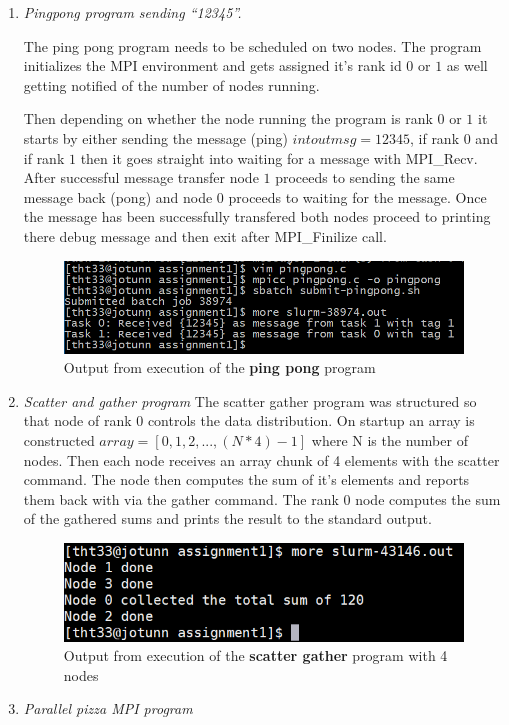 \documentclass[fontsize=14pt,a4paper]{scrartcl}
\begin{document}
\begin{enumerate}
\begin{enumerate}[label*=\arabic*.]
    \item
    \textit{Pingpong program sending ``12345''.}
    
    The ping pong program needs to be scheduled on two nodes. The program initializes the MPI environment and gets assigned it's rank id $0$ or $1$ as well getting notified of the number of nodes running.

    Then depending on whether the node running the program is rank $0$ or $1$ it starts by either sending the message (ping) $int outmsg=12345$, if rank $0$ and if rank $1$ then it goes straight into waiting for a message with MPI\_Recv. After successful message transfer node $1$ proceeds to sending the same message back (pong) and node $0$ proceeds to waiting for the message. Once the message has been successfully transfered both nodes proceed to printing there debug message and then exit after MPI\_Finilize call.
    \begin{figure}[H]
        \centering
        \includegraphics[scale=0.8]{Images/Pingpong}
        \caption{Output from execution of the \textbf{ping pong} program}
    \end{figure}

    \item
    \textit{Scatter and gather program}
    The scatter gather program was structured so that node of rank 0 controls the data distribution. On startup an array is constructed $array = [0, 1, 2, ..., (N * 4) - 1]$ where N is the number of nodes. Then each node receives an array chunk of 4 elements with the scatter command. The node then computes the sum of it’s elements and reports them back with via the gather command. The rank 0 node computes the sum of the gathered sums and prints the result to the standard output.
    \begin{figure}[H]
        \centering
        \includegraphics[scale=0.8]{Images/ScatterGather}
        \caption{Output from execution of the \textbf{scatter gather} program with 4 nodes}
    \end{figure}

    \item
    \textit{Parallel pizza MPI program}

    \end{enumerate}
\end{enumerate}
\end{document}
